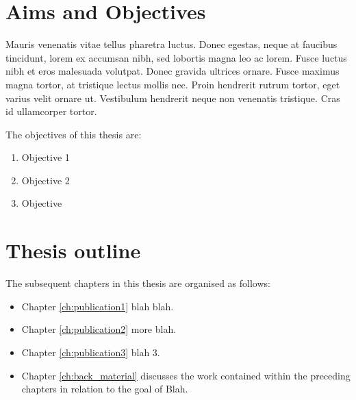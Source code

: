 \begin{refsection}
\section{Aims and Objectives}
\label{sec:aims}
Mauris venenatis vitae tellus pharetra luctus. Donec egestas, neque at faucibus tincidunt, lorem ex accumsan nibh, sed lobortis magna leo ac lorem. Fusce luctus nibh et eros malesuada volutpat. Donec gravida ultrices ornare. Fusce maximus magna tortor, at tristique lectus mollis nec. Proin hendrerit rutrum tortor, eget varius velit ornare ut. Vestibulum hendrerit neque non venenatis tristique. Cras id ullamcorper tortor.

The objectives of this thesis are:

\begin{enumerate}
	\item{Objective 1}
	\item{Objective 2}
	\item{Objective }
\end{enumerate}




\section{Thesis outline}
\label{sec:outline}
The subsequent chapters in this thesis are organised as follows:

\begin{itemize}
  \item Chapter \ref{ch:publication1} blah blah.

  \item Chapter \ref{ch:publication2} more blah.

  \item Chapter \ref{ch:publication3} blah 3.


  \item Chapter \ref{ch:back_material} discusses the work contained within the preceding chapters in relation to the goal of Blah.
\end{itemize}



\printbibliography[heading=subbibliography]
\end{refsection}
\cleardoublepage

